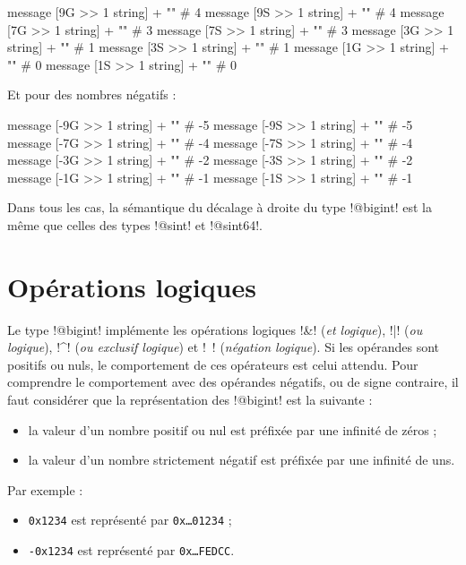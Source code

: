 \begin{galgas3}
message [9G >> 1 string] + "\n" # 4
message [9S >> 1 string] + "\n" # 4
message [7G >> 1 string] + "\n" # 3
message [7S >> 1 string] + "\n" # 3
message [3G >> 1 string] + "\n" # 1
message [3S >> 1 string] + "\n" # 1
message [1G >> 1 string] + "\n" # 0
message [1S >> 1 string] + "\n" # 0
\end{galgas3}


Et pour des nombres négatifs :

\begin{galgas3}
message [-9G >> 1 string] + "\n" # -5
message [-9S >> 1 string] + "\n" # -5
message [-7G >> 1 string] + "\n" # -4
message [-7S >> 1 string] + "\n" # -4
message [-3G >> 1 string] + "\n" # -2
message [-3S >> 1 string] + "\n" # -2
message [-1G >> 1 string] + "\n" # -1
message [-1S >> 1 string] + "\n" # -1
\end{galgas3}

Dans tous les cas, la sémantique du décalage à droite du type \ggst!@bigint! est la même que celles des types \ggst!@sint! et \ggst!@sint64!.










\section{Opérations logiques}

Le type \ggst!@bigint! implémente les opérations logiques \ggst!&! (\emph{et logique}), \ggst!|! (\emph{ou logique}), \ggst!^! (\emph{ou exclusif logique}) et \ggst!~! (\emph{négation logique}). Si les opérandes sont positifs ou nuls, le comportement de ces opérateurs est celui attendu. Pour comprendre le comportement avec des opérandes négatifs, ou de signe contraire, il faut considérer que la représentation des \ggst!@bigint! est la suivante :
\begin{itemize}
  \item la valeur d'un nombre positif ou nul est préfixée par une infinité de zéros ;
  \item la valeur d'un nombre strictement négatif est préfixée par une infinité de uns.
\end{itemize}

Par exemple :
\begin{itemize}
  \item \texttt{0x1234} est représenté par \texttt{0x…01234} ;
  \item \texttt{-0x1234} est représenté par \texttt{0x…FEDCC}.
\end{itemize}


